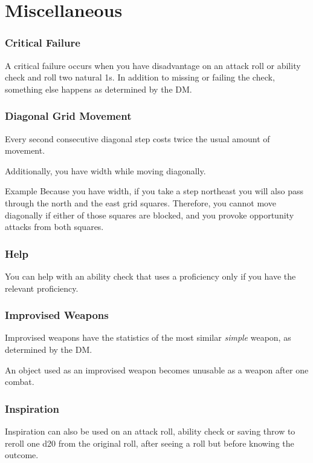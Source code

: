 \documentclass[House_Rules.tex]{subfiles}
\begin{document}
\section{Miscellaneous}

\subsubsection{Critical Failure}
A critical failure occurs when you have disadvantage on an attack roll or ability check and roll two natural 1s. In addition to missing or failing the check, something else happens as determined by the DM. 

\subsubsection{Diagonal Grid Movement}

Every second consecutive diagonal step costs twice the usual amount of movement.

Additionally, you have width while moving diagonally.

\begin{DndComment}{Example}
Because you have width, if you take a step northeast you will also pass through the north and the east grid squares. Therefore, you cannot move diagonally if either of those squares are blocked, and you provoke opportunity attacks from both squares.
\end{DndComment}

\subsubsection{Help}
You can help with an ability check that uses a proficiency only if you have the relevant proficiency.

\subsubsection{Improvised Weapons}
Improvised weapons have the statistics of the most similar \textit{simple} weapon, as determined by the DM.

An object used as an improvised weapon becomes unusable as a weapon after one combat.

\subsubsection{Inspiration}
Inspiration can also be used on an attack roll, ability check or saving throw to reroll one d20 from the original roll, after seeing a roll but before knowing the outcome.
\end{document}
